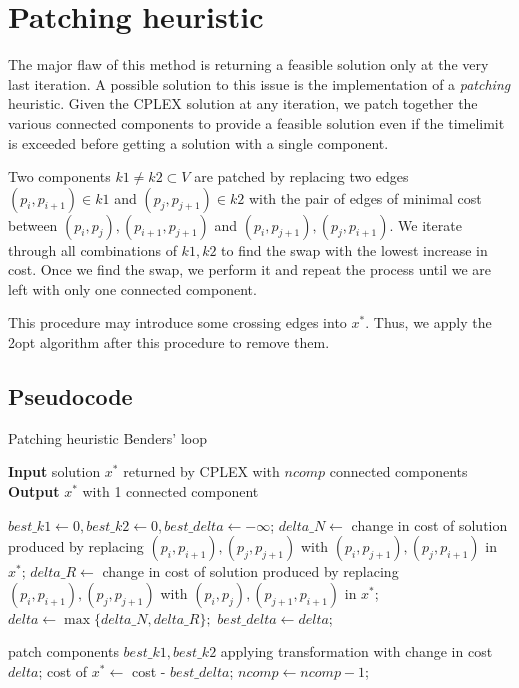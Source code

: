\section{Patching heuristic}
The major flaw of this method is returning a feasible solution only at the very last iteration. A possible solution to this issue is the implementation of a \textit{patching} heuristic. Given the CPLEX solution at any iteration, we patch together the various connected components to provide a feasible solution even if the timelimit is exceeded before getting a solution with a single component.

Two components $k1\neq k2\subset V$ are patched by replacing two edges $(p_i, p_{i+1})\in k1$ and $(p_j, p_{j+1})\in k2$ with the pair of edges of minimal cost between $(p_i,p_j), (p_{i+1},p_{j+1})$ and $(p_i,p_{j+1}),(p_j, p_{i+1})$. We iterate through all combinations of $k1,k2$ to find the swap with the lowest increase in cost. Once we find the swap, we perform it and repeat the process until we are left with only one connected component.

This procedure may introduce some crossing edges into $x^*$. Thus, we apply the 2opt algorithm after this procedure to remove them.

\newpage
\subsection{Pseudocode}
\begin{algorithm}[h]
    \caption{Patching heuristic Benders' loop}
    \hspace*{\algorithmicindent} \textbf{Input} solution $x^*$ returned by CPLEX with $ncomp$ connected components\\
    \hspace*{\algorithmicindent} \textbf{Output} $x^*$ with 1 connected component
    \begin{algorithmic}

        \State $best\_k1\leftarrow0, best\_k2\leftarrow0, best\_delta\leftarrow-\infty$;
        \State $delta\_N\leftarrow$ change in cost of solution produced by replacing
        \State $(p_i,p_{i+1}), (p_j,p_{j+1})$ with $(p_i,p_{j+1}), (p_j,p_{i+1})$ in $x^*$;
        \State $delta\_R\leftarrow$ change in cost of solution produced by replacing
        \State $(p_i,p_{i+1}), (p_j,p_{j+1})$ with $(p_i,p_j), (p_{j+1},p_{i+1})$ in $x^*$;
        \State $delta\leftarrow\max\{delta\_N,delta\_R\};$
        \State $best\_delta \leftarrow delta$;
        \EndIf
        \EndFor
        \EndFor
        \EndFor

        \State patch components $best\_k1,best\_k2$ applying transformation with change in cost
        \State $delta$;
        \State cost of $x^* \leftarrow$ cost - $best\_delta$;
        \State $ncomp \leftarrow ncomp-1$;
        \EndWhile
    \end{algorithmic}
    
\end{algorithm}

